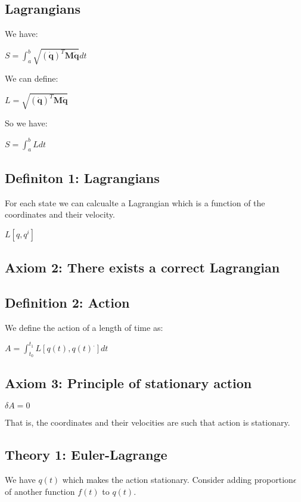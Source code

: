 
\subsection{Lagrangians}

We have:

\(S = \int_a^b \sqrt {(\mathbf {\dot q})^T\mathbf M\mathbf {\dot q}}dt\)

We can define:

\(L=\sqrt {(\mathbf {\dot q})^T\mathbf M\mathbf {\dot q}}\)

So we have:

\(S=\int_a^b L dt\)

\subsection{Definiton 1: Lagrangians}

For each state we can calcualte a Lagrangian which is a function of the coordinates and their velocity.

\(L[q, q^i]\)

\subsection{Axiom 2: There exists a correct Lagrangian}

\subsection{Definition 2: Action}

We define the action of a length of time as:

\(A=\int_{t_0}^{t_1} L[q(t), q(t)^.]dt\)

\subsection{Axiom 3: Principle of stationary action}

\(\delta A=0\)

That is, the coordinates and their velocities are such that action is stationary.

\subsection{Theory 1: Euler-Lagrange}

We have \(q(t)\) which makes the action stationary. Consider adding proportion\(\epsilon \) of another function \(f(t)\) to \(q(t)\).

